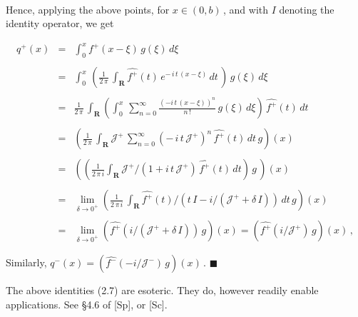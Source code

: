\documentclass[11pt]{article}
\newenvironment{Proof}
{\bigskip\noindent{\bf Proof.}~\rm}{\bigskip}
\begin{document}
\begin{Proof}
\begin{itemize}
 \end{itemize}       

\noindent Hence, applying the above points, for $x \in (0,b)$\,, and with $I$
denoting the identity operator, we get

\begin{equation}
  \begin{array}{rcl}
q^+(x) & = & \displaystyle \int_0^x f^+(x-\xi) \, g(\xi) \, d\xi \\
    && \\
    & = & \displaystyle \int_0^x \,\left(\frac{1}{2\,\pi} \, \int_{\mathbf R}
\widehat{f^+}(t) \, e^{-\,i\,t\,(x - \xi)}\,dt \,
\right)\,g(\xi)\,d\xi \\  
&& \\
& = & \displaystyle \frac{1}{2\,\pi} \,\int_{\mathbf R} \left(\int_0^x
\,\sum_{n=0}^\infty  
         \frac{(-i\,t\,(x-\xi))^n}{n\,!} \, 
         g(\xi)\,d\xi\right) \, \widehat{f^+}(t) \, dt \\ 
         && \\
& = & \displaystyle \left(\frac{1}{2\,\pi} \, \int_{\mathbf R}
         {\mathcal J}^+ \, 
         \sum_{n=0}^\infty \left(-\,i\,t\,{\mathcal J}^+\right)^n \,
         \widehat{f^+}(t) \, dt \, g\right)(x) \\ 
         && \\
& = & \displaystyle \left(\left(\frac{1}{2\,\pi\,i} \int_{\mathbf R} {\mathcal
           J}^+/\left(1 + i\,t\,{\mathcal J}^+\right) \,
         \widehat{f^+}(t) 
         \, dt\right) \, g \, \right)(x) \\
&& \\
     & = & \displaystyle \lim_{\delta \to 0^+}\left(\frac{1}{2\,\pi\,i}\,\int_{\mathbf R}
      \widehat{f^+}(t)/\left(t\,I - i/\left({\mathcal
          J}^++\delta\,I\right)\right) \, dt \, 
      g\right)(x) \\ 
      && \\
      & = & \displaystyle \lim_{\delta \to 0^+}
      \left(\widehat{f^+}\left(i/\left({\mathcal J}^+ +
      \delta\,I\right)\right)\,g\right)(x) = 
      \left(\widehat{f^+}\left(i/{\mathcal J}^+\right)\,g\right)(x)\,,
  \end{array}
      \label{equation:2.12}
\end{equation} 

\noindent Similarly, $q^-(x) = \left(\widehat{f^-}\left(-i/{\mathcal
  J}^-\right)\,g\right)(x)$\,.  
  \end{Proof} $\blacksquare$

 \vspace{.2in} \noindent The above identities (2.7) are esoteric. They
 do, however readily enable applications. See \S4.6 of [Sp], or [Sc]. 
\end{document}
